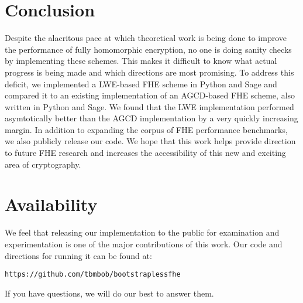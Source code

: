 \documentclass[letterpaper,twocolumn,10pt]{article}
\begin{document}
\section{Conclusion}
Despite the alacritous pace at which theoretical work is being done to improve the performance of fully homomorphic encryption, no one is doing sanity checks by implementing these schemes. This makes it difficult to know what actual progress is being made and which directions are most promising. To address this deficit, we implemented a LWE-based FHE scheme in Python and Sage and compared it to an existing implementation of an AGCD-based FHE scheme, also written in Python and Sage. We found that the LWE implementation performed asymtotically better than the AGCD implementation by a very quickly increasing margin. In addition to expanding the corpus of FHE performance benchmarks, we also publicly release our code. We hope that this work helps provide direction to future FHE research and increases the accessibility of this new and exciting area of cryptography.


\section{Availability}
We feel that releasing our implementation to the public for examination and experimentation is one of the major contributions of this work. Our code and directions for running it can be found at:

\begin{center}
{\tt https://github.com/tbmbob/bootstraplessfhe}\\
\end{center}

If you have questions, we will do our best to answer them.
\end{document}
